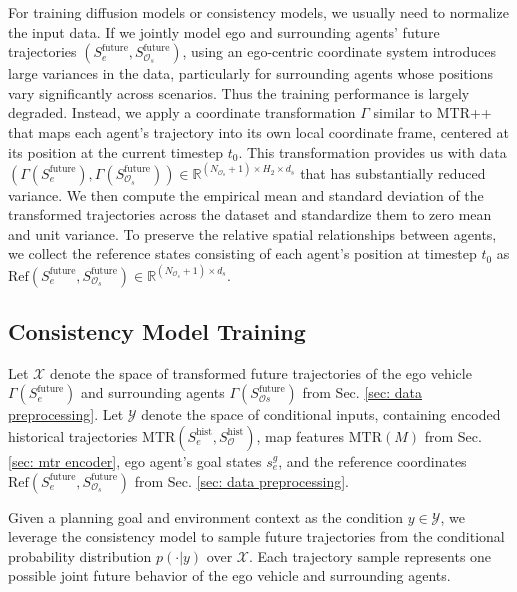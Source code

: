 For training diffusion models or consistency models, we usually need to normalize the input data.
If we jointly model ego and surrounding agents' future trajectories $(S_e^{\text{future}}, S_{\mathcal{O}_s}^{\text{future}})$, using an ego-centric coordinate system introduces large variances in the data, particularly for surrounding agents whose positions vary significantly across scenarios.
Thus the training performance is largely degraded.
Instead, we apply a coordinate transformation $\Gamma$ similar to MTR++ \citep{shi2024mtr++} that maps each agent's trajectory into its own local coordinate frame, centered at its position at the current timestep $t_0$.
This transformation provides us with data $(\Gamma(S_e^{\text{future}}),\Gamma(S_{\mathcal{O}_s}^{\text{future}})) \in \mathbb{R}^{(N_{\mathcal{O}_s} + 1) \times H_2 \times d_s}$ that has substantially reduced variance.
We then compute the empirical mean and standard deviation of the transformed trajectories across the dataset and standardize them to zero mean and unit variance.
To preserve the relative spatial relationships between agents, we collect the reference states consisting of each agent's position at timestep $t_0$ as $\text{Ref}(S_e^{\text{future}}, S_{\mathcal{O}_s}^{\text{future}}) \in \mathbb{R}^{(N_{\mathcal{O}_s} + 1) \times d_s}$.

\subsection{Consistency Model Training}

Let $\mathcal{X}$ denote the space of transformed future trajectories of the ego vehicle $\Gamma(S_e^{\text{future}})$ and surrounding agents $\Gamma(S_{\mathcal{O}s}^{\text{future}})$ from Sec. \ref{sec: data preprocessing}. 
Let $\mathcal{Y}$ denote the space of conditional inputs, containing encoded historical trajectories $\text{MTR}(S_e^{\text{hist}}, S_{\mathcal{O}}^{\text{hist}})$, map features $\text{MTR}(M)$ from Sec. \ref{sec: mtr encoder}, ego agent's goal states $s_e^g$, and the reference coordinates $\text{Ref}(S_e^{\text{future}}, S_{\mathcal{O}_s}^{\text{future}})$ from Sec. \ref{sec: data preprocessing}.

Given a planning goal and environment context as the condition $y \in \mathcal{Y}$,  we leverage the consistency model \citep{song2023consistency,song2023improved} to sample future trajectories from the conditional probability distribution $p(\cdot|y)$ over $\mathcal{X}$.
Each trajectory sample represents one possible joint future behavior of the ego vehicle and surrounding agents.

